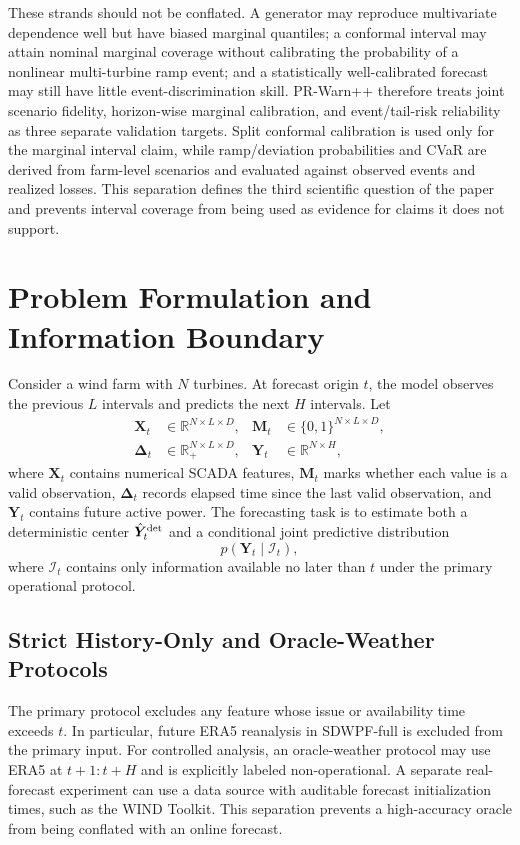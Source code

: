 \documentclass[journal]{IEEEtran}
\newcommand{\R}{\mathbb{R}}
\newcommand{\1}{\mathbb{I}}
\begin{document}
These strands should not be conflated. A generator may reproduce multivariate dependence well but have biased marginal quantiles; a conformal interval may attain nominal marginal coverage without calibrating the probability of a nonlinear multi-turbine ramp event; and a statistically well-calibrated forecast may still have little event-discrimination skill. PR-Warn++ therefore treats joint scenario fidelity, horizon-wise marginal calibration, and event/tail-risk reliability as three separate validation targets. Split conformal calibration is used only for the marginal interval claim, while ramp/deviation probabilities and CVaR are derived from farm-level scenarios and evaluated against observed events and realized losses. This separation defines the third scientific question of the paper and prevents interval coverage from being used as evidence for claims it does not support.

\section{Problem Formulation and Information Boundary}
Consider a wind farm with $N$ turbines. At forecast origin $t$, the model observes the previous $L$ intervals and predicts the next $H$ intervals. Let
\begin{align}
\bm X_t &\in \R^{N\times L\times D}, &
\bm M_t &\in \{0,1\}^{N\times L\times D}, \\
\bm \Delta_t &\in \R_+^{N\times L\times D}, &
\bm Y_t &\in \R^{N\times H},
\end{align}
where $\bm X_t$ contains numerical SCADA features, $\bm M_t$ marks whether each value is a valid observation, $\bm\Delta_t$ records elapsed time since the last valid observation, and $\bm Y_t$ contains future active power. The forecasting task is to estimate both a deterministic center $\hat{\bm Y}^{\rm det}_t$ and a conditional joint predictive distribution
\begin{equation}
p(\bm Y_t\mid \mathcal I_t),
\end{equation}
where $\mathcal I_t$ contains only information available no later than $t$ under the primary operational protocol.

\subsection{Strict History-Only and Oracle-Weather Protocols}
The primary protocol excludes any feature whose issue or availability time exceeds $t$. In particular, future ERA5 reanalysis in SDWPF-full is excluded from the primary input. For controlled analysis, an oracle-weather protocol may use ERA5 at $t+1{:}t+H$ and is explicitly labeled non-operational. A separate real-forecast experiment can use a data source with auditable forecast initialization times, such as the WIND Toolkit. This separation prevents a high-accuracy oracle from being conflated with an online forecast.
\end{document}
